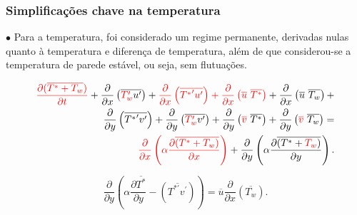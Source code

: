 \documentclass[xcolor=dvipsnames,10pt,aspectratio=169]{beamer}
\begin{document}
		\begin{frame}
		\frametitle{Simplificações chave na temperatura}
		$\bullet$ Para a temperatura, foi considerado um regime permanente, derivadas nulas quanto à temperatura e diferença de temperatura, além de que considerou-se a temperatura de parede estável, ou seja, sem flutuações. 
	 	\begin{center}
	 	\begin{equation*}
	 		\begin{split}
	 		\color{red}\frac{\partial ( \overline{ T^\ast + T_w } ) }{\partial t} \color{black} +
	 		\frac{\partial{}}{\partial{x}} \left(\overline{ \color{red}T_w^{\prime} \color{black} u^{\prime}}\right) +
	 		\color{red}\frac{\partial{}}{\partial{x}} \left(\overline{{T^{\ast}}^{\prime} u^{\prime}}\right)+ \color{black}
	 		\color{red} \frac{\partial{}}{\partial{x}}\left(\overline{u} \ \overline{T^{\ast}}\right) \color{black}+ 
	 		\frac{\partial{}}{\partial{x}}\left(\overline{u} \ \overline{T_w}\right)+ 
	 		\\
	 		\frac{\partial{}}{\partial{y}} \left(\overline{{T^{\ast}}^{\prime} v^{\prime}}\right)+
	 		\frac{\partial{}}{\partial{y}} \left(\overline{\color{red}T_w^\prime \color{black} v^\prime}\right) + \frac{\partial{}}{\partial{y}}\left(\color{red}\overline{v} \color{black} \ \overline{T^\ast}\right) +
	 		\frac{\partial{}}{\partial{y}}\left(\color{red}\overline{v}\color{black} \ \overline{T_w}\right) 
	 		= 
	 		\\
	 		\color{red}{\frac{\partial{}}{\partial{x}}} \left(\alpha {\frac{\partial{\overline{(T^\ast + T_w)}}}{\partial{x}}} \right) \color{black}+
	 		{\frac{\partial{}}{\partial{y}}} \left(\alpha {\frac{\partial{\overline{(T^\ast + \color{red} T_w \color{black})}}}{\partial{y}}} \right) .
	 		\end{split}
	 	\end{equation*}
 		\end{center}
 		\begin{equation}\label{equation_var}
 			{\frac{\partial{}}{\partial{y}}} \left(\alpha {\frac{\partial{\overline{T^\ast}}}{\partial{y}}}   
 			- \left(\overline{ T^{\ast\prime} v^\prime}\right) \right)
 			= 
 			\overline{u}\frac{\partial{}}{\partial{x}}\left(\overline{T_w}\right)  .
 		\end{equation}
		\end{frame}
	
		
		
		
		
\end{document}
